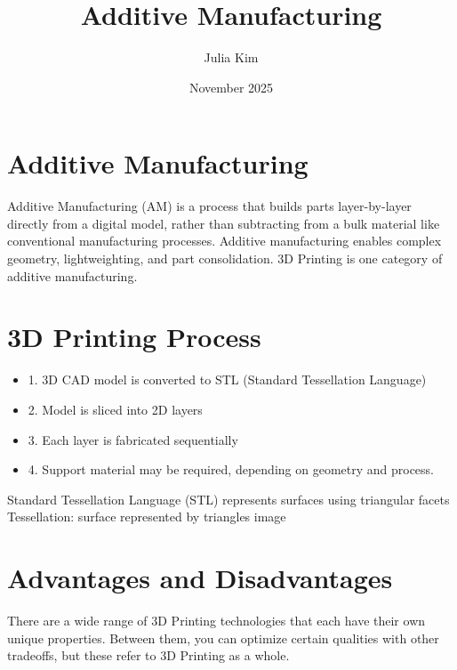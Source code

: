 \documentclass{article}
\title{Additive Manufacturing}
\author{Julia Kim}
\date{November 2025}
\newenvironment{callout}
{

}
{
}
\begin{document}
\maketitle

\section{Additive Manufacturing}

Additive Manufacturing (AM) is a process that builds parts layer-by-layer directly from a digital model, rather than subtracting from a bulk material like conventional manufacturing processes. Additive manufacturing enables complex geometry, lightweighting, and part consolidation. 3D Printing is one category of additive manufacturing.


\section{3D Printing Process}

\begin{itemize}
    \item 1. 3D CAD model is converted to STL (Standard Tessellation Language)
    \item 2. Model is sliced into 2D layers
    \item 3. Each layer is fabricated sequentially
    \item 4. Support material may be required, depending on geometry and process.
\end{itemize}

\begin{callout}
Standard Tessellation Language (STL) represents surfaces using triangular facets
Tessellation: surface represented by triangles
image
\end{callout}

\section{Advantages and Disadvantages}
There are a wide range of 3D Printing technologies that each have their own unique properties. Between them, you can optimize certain qualities with other tradeoffs, but these refer to 3D Printing as a whole.
\end{document}
